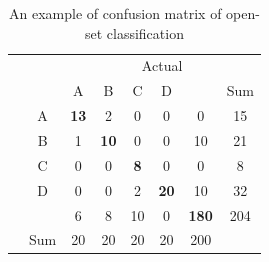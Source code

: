 \begin{table}[t]
	\center
	\caption{An example of confusion matrix of open-set classification}\label{chap:eval_methods:tbl:multi_confusion}
	\begin{tabular}{c c c c c c c c}
		& & \multicolumn{6}{c}{Actual} & \\
		\cline{3-7}
		\multirow{7}{*}{\rotatebox[origin=c]{90}{Predicted}} & & \multicolumn{1}{|c}{A} & \multicolumn{1}{c}{B} & \multicolumn{1}{c}{C} & \multicolumn{1}{c}{D} & \multicolumn{1}{c|}{\emptyset} & Sum \\
		\cline{2-7}
		& \multicolumn{1}{|c}{A} & \multicolumn{1}{|c}{\textbf{13}} & \multicolumn{1}{c}{2} & \multicolumn{1}{c}{0} & \multicolumn{1}{c}{0} & \multicolumn{1}{c|}{0} & 15 \\
		& \multicolumn{1}{|c}{B} & \multicolumn{1}{|c}{1} & \multicolumn{1}{c}{\textbf{10}} & \multicolumn{1}{c}{0} & \multicolumn{1}{c}{0} & \multicolumn{1}{c|}{10} & 21 \\
		& \multicolumn{1}{|c}{C} & \multicolumn{1}{|c}{0} & \multicolumn{1}{c}{0} & \multicolumn{1}{c}{\textbf{8}} & \multicolumn{1}{c}{0} & \multicolumn{1}{c|}{0} & 8 \\
		& \multicolumn{1}{|c}{D} & \multicolumn{1}{|c}{0} & \multicolumn{1}{c}{0} & \multicolumn{1}{c}{2} & \multicolumn{1}{c}{\textbf{20}} & \multicolumn{1}{c|}{10} & 32 \\
		& \multicolumn{1}{|c}{\emptyset} & \multicolumn{1}{|c}{6} & \multicolumn{1}{c}{8} & \multicolumn{1}{c}{10} & \multicolumn{1}{c}{0} & \multicolumn{1}{c|}{\textbf{180}} & {204} \\
		\cline{2-7}
		& Sum & 20 & 20 & 20 & 20 & 200 & \\
	\end{tabular}
\end{table}


